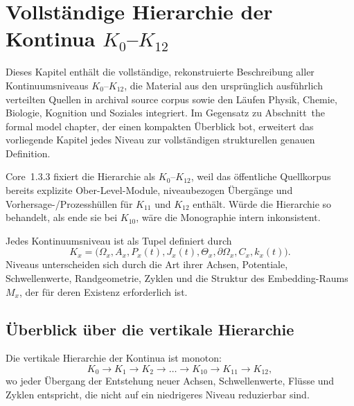 
\section{Vollständige Hierarchie der Kontinua \texorpdfstring{\texorpdfstring{$K_0$}{K\_0}–$K_{12}$}{K0–K12}}
\label{sec:klevels-full}

Dieses Kapitel enthält die vollständige, rekonstruierte Beschreibung aller
Kontinuumsniveaus \(K_0\)–\(K_{12}\), die Material aus den ursprünglich
ausführlich verteilten Quellen in archival source corpus sowie den Läufen Physik, Chemie,
Biologie, Kognition und Soziales integriert.
Im Gegensatz zu Abschnitt~the formal model chapter, der einen kompakten Überblick bot,
erweitert das vorliegende Kapitel jedes Niveau zur vollständigen strukturellen
genauen Definition.

Core~1.3.3 fixiert die Hierarchie als \(K_0\)–\(K_{12}\), weil das öffentliche
Quellkorpus bereits explizite Ober-Level-Module, niveaubezogen Übergänge und
Vorhersage-/Prozesshüllen für \(K_{11}\) und \(K_{12}\) enthält.
Würde die Hierarchie so behandelt, als ende sie bei \(K_{10}\), wäre die
Monographie intern inkonsistent.

Jedes Kontinuumsniveau ist als Tupel definiert durch
\[
    K_x = \big(\Omega_x, A_x, P_x(t), J_x(t), \Theta_x,
           \partial\Omega_x, C_x, k_x(t)\big).
\]
Niveaus unterscheiden sich durch die Art ihrer Achsen, Potentiale, Schwellenwerte,
Randgeometrie, Zyklen und die Struktur des Embedding-Raums
\(M_x\), der für deren Existenz erforderlich ist.

\subsection{Überblick über die vertikale Hierarchie}

Die vertikale Hierarchie der Kontinua ist monoton:
\[
    K_0 \rightarrow K_1 \rightarrow K_2 \rightarrow \dots
    \rightarrow K_{10} \rightarrow K_{11} \rightarrow K_{12},
\]
wo jeder Übergang der Entstehung neuer Achsen,
Schwellenwerte, Flüsse und Zyklen entspricht, die nicht auf ein niedrigeres
Niveau reduzierbar sind.

